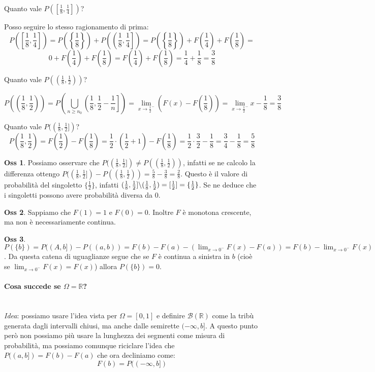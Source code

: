\documentclass[12pt, a4paper]{report}
\theoremstyle{definition}
\newtheorem*{observation}{Oss}
\DeclareRobustCommand{\R}{\mathbb{R}}%
\DeclareRobustCommand{\B}{\mathcal{B}}%
\begin{document}
\noindent
Quanto vale \(P([\frac{1}{8},\frac{1}{4}])\)?

Posso seguire lo stesso ragionamento di prima:
\[P\left(\left[\frac{1}{8},\frac{1}{4}\right]\right)=P\left(\left\{\frac{1}{8}\right\}\right)
+P\left(\left(\frac{1}{8},\frac{1}{4}\right]\right)=P\left(\left\{\frac{1}{8}\right\}\right)+
F\left(\frac{1}{4}\right)+F\left(\frac{1}{8}\right)=\]
\[0+F\left(\frac{1}{4}\right)+F\left(\frac{1}{8}\right)=F\left(\frac{1}{4}\right)
+F\left(\frac{1}{8}\right)=\frac{1}{4}+\frac{1}{8}=\frac{3}{8}\]

\noindent
Quanto vale \(P((\frac{1}{8},\frac{1}{2}))\)?

\[P\left(\left(\frac{1}{8},\frac{1}{2}\right)\right)=
P\left(\bigcup_{n\geq n_0}\left(\frac{1}{8},\frac{1}{2}-\frac{1}{n}\right]\right)
=\lim_{x\rightarrow\frac{1}{2}^-}\left(F(x)-F\left(\frac{1}{8}\right)\right)=
\lim_{x\rightarrow\frac{1}{2}^-}x-\frac{1}{8}=\frac{3}{8}\]

Quanto vale \(P((\frac{1}{8},\frac{1}{2}])\)?
\[P\left(\frac{1}{8},\frac{1}{2}\right)=F\left(\frac{1}{2}\right)-
F\left(\frac{1}{8}\right)=\frac{1}{2}\cdot \left(\frac{1}{2}+1\right)-F\left(\frac{1}{8}\right)
=\frac{1}{2}\cdot \frac{3}{2}-\frac{1}{8}=\frac{3}{4}-\frac{1}{8}=\frac{5}{8}\]

\newpage
\begin{observation}
	Possiamo osservare che \(P((\frac{1}{8},\frac{1}{2}])\neq P((\frac{1}{8},
	\frac{1}{2}))\), infatti se ne calcolo la differenza ottengo \(P((\frac{1}{8},
	\frac{1}{2}])-P((\frac{1}{8},\frac{1}{2}))=\frac{5}{8}-\frac{3}{8}=\frac{2}{8}\).
	Questo è il valore di probabilità del singoletto $\{\frac{1}{2}\}$, infatti
	\((\frac{1}{8},\frac{1}{2}]\symbol{92}(\frac{1}{8},\frac{1}{2})=[\frac{1}{2}]=
	\{\frac{1}{2}\}\). Se ne deduce che i singoletti possono avere probabilità
	diversa da 0.
\end{observation}
\begin{observation}
	Sappiamo che \(F(1)=1\) e \(F(0)=0\). Inoltre $F$ è monotona crescente, ma
	non è necessariamente continua.
\end{observation}
\begin{observation}
	\(P(\{b\})=P((A,b])-P((a,b))=F(b)-F(a)-(\lim_{x\rightarrow 0^-}F(x)-F(a))=
	F(b)-\lim_{x\rightarrow 0^-}F(x)\). Da questa catena di uguaglianze segue
	che se $F$ è continua a sinistra in $b$ (cioè se \(\lim_{x\rightarrow 0^-}
	F(x)=F(x)\)) allora \(P(\{b\})=0\).
\end{observation}

\paragraph{Cosa succede se \(\Omega=\R\)?}\mbox{}\\
\emph{Idea}: possiamo usare l'idea vista per \(\Omega=[0,1]\) e definire
\(\B(\R)\) come la tribù generata dagli intervalli chiusi, ma
anche dalle semirette \((-\infty,b]\). A questo punto però non possiamo più
usare la lunghezza dei segmenti come misura di probabilità, ma possiamo comunque
riciclare l'idea che \(P((a,b])=F(b)-F(a)\) che ora decliniamo come:
\[F(b)=P((-\infty,b])\]
\end{document}
